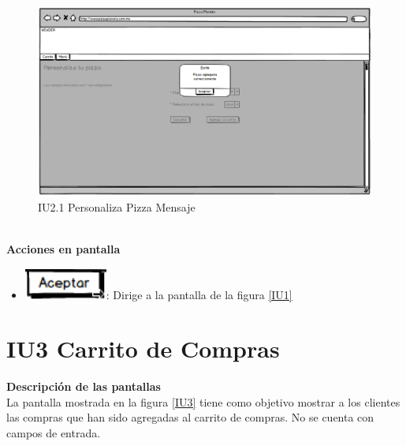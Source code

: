 \begin{itemize}
		
		\begin{figure}[h]
			
			\begin{center}				
				
				\includegraphics[scale=0.50]{imagenes/IUs/RegistroSolicitantes/iu1-IniciarSesion/IU2-1-PersonalizaPizzaMensaje.png}
				\caption{IU2.1 Personaliza Pizza Mensaje}
				\label{IU2.1}
				
			\end{center}
			
		\end{figure}
	
	\noindent \textbf{\\Acciones en pantalla}
	
		\begin{itemize}
		
		\item \includegraphics[scale=0.500]{imagenes/iconografia/Aceptar.png}: Dirige a la pantalla de la figura \ref{IU1}
		
	\end{itemize}
		
	\end{itemize}

\hypertarget{IU3}{}
\section{IU3 Carrito de Compras}

\noindent \textbf{Descripción de las pantallas}\\

La pantalla mostrada en la figura \ref{IU3} tiene como objetivo mostrar a los clientes las compras que han sido agregadas al carrito de compras.
No se cuenta con campos de entrada.

